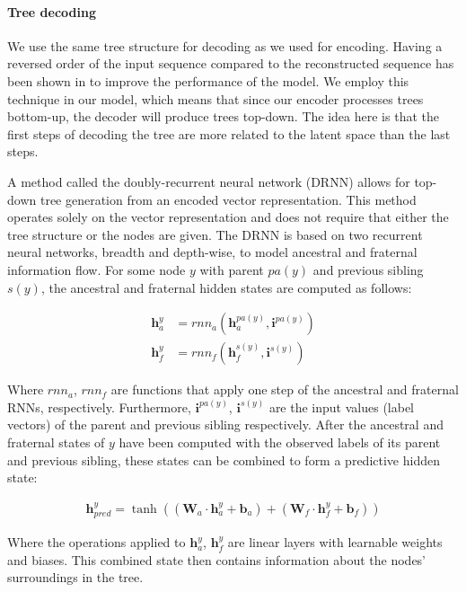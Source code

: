\paragraph{Tree decoding} We use the same tree structure for decoding as we used for encoding. 
Having a reversed order of the input sequence compared to the reconstructed sequence has been shown in \cite{fabius2015variational} to improve the performance of the model. 
We employ this technique in our model, which means that since our encoder processes trees bottom-up, the decoder will produce trees top-down. 
The idea here is that the first steps of decoding the tree are more related to the latent space than the last steps.



A method called the doubly-recurrent neural network (DRNN) \cite{alvarezmelis2017tree} allows for top-down tree generation from an encoded vector representation. This method operates solely on the vector representation and does not require that either the tree structure or the nodes are given. The DRNN is based on two recurrent neural networks, breadth and depth-wise, to model ancestral and fraternal information flow. For some node $y$ with parent $pa(y)$ and previous sibling $s(y)$, the ancestral and fraternal hidden states are computed as follows:

\begin{align}
    \mathbf{h}_a^y &= rnn_a(\mathbf{h}_a^{pa(y)}, \mathbf{i}^{pa(y)}) \\ \label{eq:ancestral_update}
    \mathbf{h}_f^y &= rnn_f(\mathbf{h}_f^{s(y)}, \mathbf{i}^{s(y)}) 
\end{align}

Where $rnn_a$, $rnn_f$ are functions that apply one step of the ancestral and fraternal RNNs, respectively. Furthermore, $\mathbf{i}^{pa(y)}$, $\mathbf{i}^{s(y)}$ are the input values (label vectors) of the parent and previous sibling respectively. After the ancestral and fraternal states of $y$ have been computed with the observed labels of its parent and previous sibling, these states can be combined to form a predictive hidden state:

\begin{align}
    \mathbf{h}^y_{pred} = \tanh\left((\mathbf{W}_a \cdot \mathbf{h}_a^y + \mathbf{b}_a) + (\mathbf{W}_f \cdot \mathbf{h}_f^y + \mathbf{b}_f)\right)
\end{align}

Where the operations applied to $\mathbf{h}_a^y$, $\mathbf{h}_f^y$ are linear layers with learnable weights and biases. This combined state then contains information about the nodes' surroundings in the tree.




